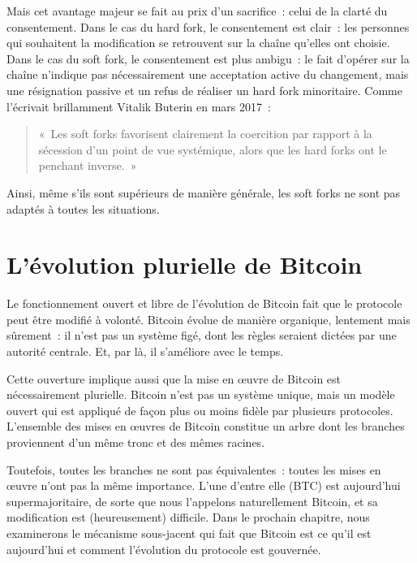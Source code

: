 Mais cet avantage majeur se fait au prix d'un sacrifice~: celui de la clarté du consentement. Dans le cas du hard fork, le consentement est clair~: les personnes qui souhaitent la modification se retrouvent sur la chaîne qu'elles ont choisie. Dans le cas du soft fork, le consentement est plus ambigu~: le fait d'opérer sur la chaîne n'indique pas nécessairement une acceptation active du changement, mais une résignation passive et un refus de réaliser un hard fork minoritaire. Comme l'écrivait brillamment Vitalik Buterin en mars 2017~:

\begin{quote}
«~Les soft forks favorisent clairement la coercition par rapport à la sécession d'un point de vue systémique, alors que les hard forks ont le penchant inverse.~»
\end{quote} %

Ainsi, même s'ils sont supérieurs de manière générale, les soft forks ne sont pas adaptés à toutes les situations.

\section*{L'évolution plurielle de Bitcoin}

Le fonctionnement ouvert et libre de l'évolution de Bitcoin fait que le protocole peut être modifié à volonté. Bitcoin évolue de manière organique, lentement mais sûrement~: il n'est pas un système figé, dont les règles seraient dictées par une autorité centrale. Et, par là, il s'améliore avec le temps.

Cette ouverture implique aussi que la mise en œuvre de Bitcoin est nécessairement plurielle. Bitcoin n'est pas un système unique, mais un modèle ouvert qui est appliqué de façon plus ou moins fidèle par plusieurs protocoles. L'ensemble des mises en œuvres de Bitcoin constitue un arbre dont les branches proviennent d'un même tronc et des mêmes racines.

Toutefois, toutes les branches ne sont pas équivalentes~: toutes les mises en œuvre n'ont pas la même importance. L'une d'entre elle (BTC) est aujourd'hui supermajoritaire, de sorte que nous l'appelons naturellement Bitcoin, et sa modification est (heureusement) difficile. Dans le prochain chapitre, nous examinerons le mécanisme sous-jacent qui fait que Bitcoin est ce qu'il est aujourd'hui et comment l'évolution du protocole est gouvernée.